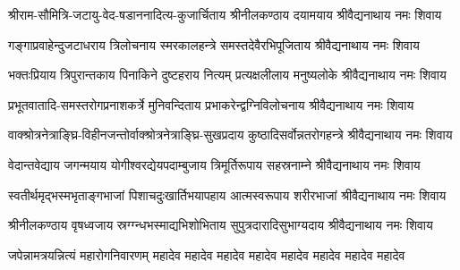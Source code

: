 
\twolineshloka
{श्रीराम-सौमित्रि-जटायु-वेद-षडाननादित्य-कुजार्चिताय}
{श्रीनीलकण्ठाय दयामयाय श्रीवैद्यनाथाय नमः शिवाय}

%
\twolineshloka
{गङ्गाप्रवाहेन्दुजटाधराय त्रिलोचनाय स्मरकालहन्त्रे}
{समस्तदेवैरभिपूजिताय श्रीवैद्यनाथाय नमः शिवाय}

\twolineshloka
{भक्तःप्रियाय त्रिपुरान्तकाय पिनाकिने दुष्टहराय नित्यम्}
{प्रत्यक्षलीलाय मनुष्यलोके श्रीवैद्यनाथाय नमः शिवाय}

\twolineshloka
{प्रभूतवातादि-समस्तरोगप्रनाशकर्त्रे मुनिवन्दिताय}
{प्रभाकरेन्द्वग्निविलोचनाय श्रीवैद्यनाथाय नमः शिवाय}

\twolineshloka
{वाक्श्रोत्रनेत्राङ्घ्रि-विहीनजन्तोर्वाक्श्रोत्रनेत्राङ्घ्रि-सुखप्रदाय}
{कुष्ठादिसर्वोन्नतरोगहन्त्रे श्रीवैद्यनाथाय नमः शिवाय}

\twolineshloka
{वेदान्तवेद्याय जगन्मयाय योगीश्वरद्येयपदाम्बुजाय}
{त्रिमूर्तिरूपाय सहस्रनाम्ने श्रीवैद्यनाथाय नमः शिवाय}

\twolineshloka
{स्वतीर्थमृद्भस्मभृताङ्गभाजां पिशाचदुःखार्तिभयापहाय}
{आत्मस्वरूपाय शरीरभाजां श्रीवैद्यनाथाय नमः शिवाय}

\twolineshloka
{श्रीनीलकण्ठाय वृषध्वजाय स्रग्ग्न्धभस्माद्यभिशोभिताय}
{सुपुत्रदारादिसुभाग्यदाय श्रीवैद्यनाथाय नमः शिवाय}

{जपेन्नामत्रयन्नित्यं महारोगनिवारणम्}
{महादेव महादेव महादेव महादेव महादेव महादेव महादेव महादेव}
